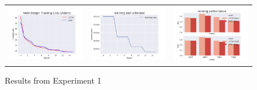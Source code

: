 \documentclass{sigkddExp}
\begin{document}
\begin{figure}[h]
\begin{tabular}{ccc}
    \includegraphics[width=0.7\columnwidth]{img/report_training_loss_part1.png}
&   \includegraphics[width=0.7\columnwidth]{img/report_learning_rate_schedule.png}
&   \includegraphics[width=0.7\columnwidth]{img/report_ranking_performance.png}
\end{tabular}
\label{fig:exp1a}
\caption{Results from Experiment 1}
\end{figure}
\end{document}
